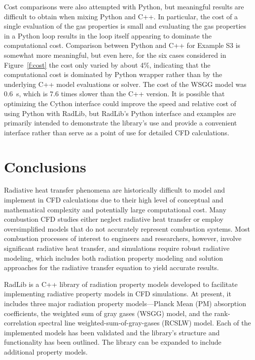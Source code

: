 \documentclass[preprint,12pt]{elsarticle}
\begin{document}
    Cost comparisons were also attempted with Python, but meaningful results are difficult to obtain when mixing Python and C++. In particular, the cost of a single evaluation of the gas properties is small and evaluating the gas properties in a Python loop results in the loop itself appearing to dominate the computational cost. Comparison between Python and C++ for Example S3 is somewhat more meaningful, but even here, for the six cases considered in Figure~\ref{f:cost} the cost only varied by about 4\%, indicating that the computational cost is dominated by Python wrapper rather than by the underlying C++ model evaluations or solver. The cost of the WSGG model was 0.6~s, which is 7.6 times slower than the C++ version. It is possible that optimizing the Cython interface could improve the speed and relative cost of using Python with RadLib, but RadLib's Python interface and examples are primarily intended to demonstrate the library's use and provide a convenient interface rather than serve as a point of use for detailed CFD calculations.



    \section{Conclusions} \label{s:conclusions}

    Radiative heat transfer phenomena are historically difficult to model and implement in CFD calculations due to their high level of conceptual and mathematical complexity and potentially large computational cost. Many combustion CFD studies either neglect radiative heat transfer or employ oversimplified models that do not accurately represent combustion systems. Most combustion processes of interest to engineers and researchers, however, involve significant radiative heat transfer, and simulations require robust radiative modeling, which includes both radiation property modeling and solution approaches for the radiative transfer equation to yield accurate results.

    RadLib is a C++ library of radiation property models developed to facilitate implementing radiative property models in CFD simulations. At present, it includes three major radiation property models---Planck Mean (PM) absorption coefficients, the weighted sum of gray gases (WSGG) model, and the rank-correlation spectral line weighted-sum-of-gray-gases (RCSLW) model. Each of the implemented models has been validated and the library's structure and functionality has been outlined. The library can be expanded to include additional property models.
\end{document}
